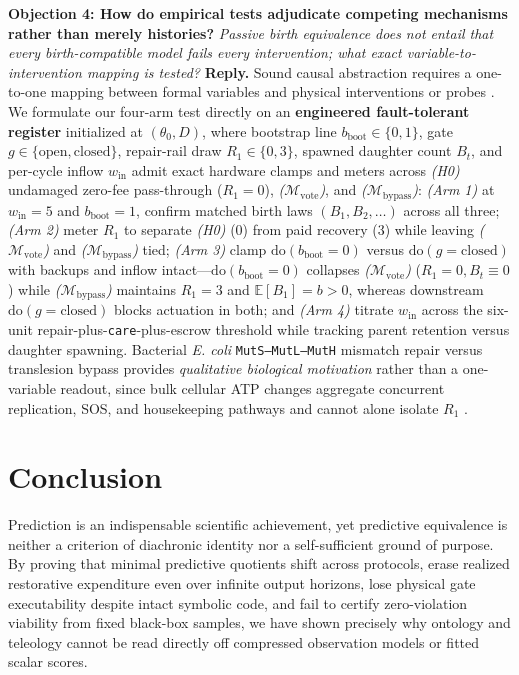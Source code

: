 \documentclass[11pt,a4paper]{article}
\begin{document}
\textbf{Objection 4: How do empirical tests adjudicate competing
mechanisms rather than merely histories?} \emph{Passive birth
equivalence does not entail that every birth-compatible model fails
every intervention; what exact variable-to-intervention mapping is
tested?} \textbf{Reply.} Sound causal abstraction requires a one-to-one
mapping between formal variables and physical interventions or probes
\citep{craver2007, rubenstein2017}. We formulate our four-arm test
directly on an \textbf{engineered fault-tolerant register} initialized
at \((\theta_0, D)\), where bootstrap line
\(b_{\mathrm{boot}} \in \{0,1\}\), gate
\(g \in \{\mathrm{open}, \mathrm{closed}\}\), repair-rail draw
\(R_1 \in \{0,3\}\), spawned daughter count \(B_t\), and per-cycle
inflow \(w_{\mathrm{in}}\) admit exact hardware clamps and meters across
\emph{(H0)} undamaged zero-fee pass-through (\(R_1 = 0\)),
\emph{(\(\mathcal{M}_{\mathrm{vote}}\))}, and
\emph{(\(\mathcal{M}_{\mathrm{bypass}}\))}: \emph{(Arm 1)} at
\(w_{\mathrm{in}} = 5\) and \(b_{\mathrm{boot}} = 1\), confirm matched
birth laws \((B_1, B_2, \dots)\) across all three; \emph{(Arm 2)} meter
\(R_1\) to separate \emph{(H0)} (\(0\)) from paid recovery (\(3\)) while
leaving \emph{(\(\mathcal{M}_{\mathrm{vote}}\))} and
\emph{(\(\mathcal{M}_{\mathrm{bypass}}\))} tied; \emph{(Arm 3)} clamp
\(\mathrm{do}(b_{\mathrm{boot}} = 0)\) versus
\(\mathrm{do}(g = \mathrm{closed})\) with backups and inflow
intact---\(\mathrm{do}(b_{\mathrm{boot}} = 0)\) collapses
\emph{(\(\mathcal{M}_{\mathrm{vote}}\))} (\(R_1 = 0, B_t \equiv 0\))
while \emph{(\(\mathcal{M}_{\mathrm{bypass}}\))} maintains \(R_1 = 3\)
and \(\mathbb{E}[B_1] = b > 0\), whereas downstream
\(\mathrm{do}(g = \mathrm{closed})\) blocks actuation in both; and
\emph{(Arm 4)} titrate \(w_{\mathrm{in}}\) across the six-unit
repair-plus-\texttt{care}-plus-escrow threshold while tracking parent
retention versus daughter spawning. Bacterial \emph{E. coli}
\texttt{MutS–MutL–MutH} mismatch repair versus translesion bypass
\citep{auWelshModrich1992, hasanLeach2015} provides \emph{qualitative
biological motivation} rather than a one-variable readout, since bulk
cellular ATP changes aggregate concurrent replication, SOS, and
housekeeping pathways and cannot alone isolate \(R_1\) \citep{mayo2018}.

\section{Conclusion}\label{conclusion}

Prediction is an indispensable scientific achievement, yet predictive
equivalence is neither a criterion of diachronic identity nor a
self-sufficient ground of purpose. By proving that minimal predictive
quotients shift across protocols, erase realized restorative expenditure
even over infinite output horizons, lose physical gate executability
despite intact symbolic code, and fail to certify zero-violation
viability from fixed black-box samples, we have shown precisely why
ontology and teleology cannot be read directly off compressed
observation models or fitted scalar scores.
\end{document}
